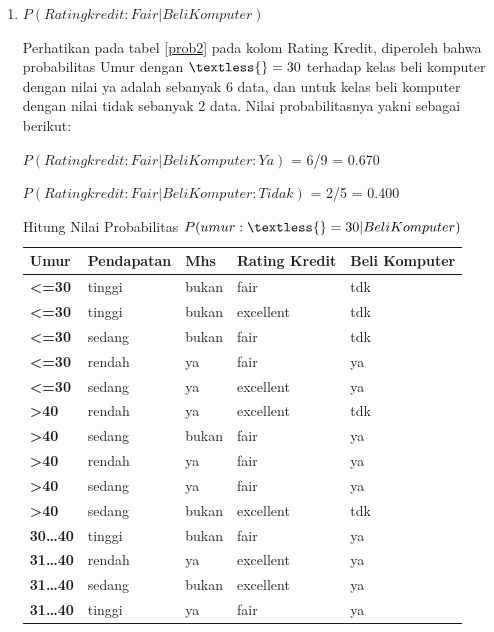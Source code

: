 \begin{enumerate}
\item $P(Ratingkredit:Fair|Beli Komputer)$
\par Perhatikan pada tabel \ref{prob2} pada kolom Rating Kredit, diperoleh bahwa probabilitas Umur dengan $\textless{}=30$ terhadap kelas beli komputer dengan nilai ya adalah sebanyak 6 data, dan untuk kelas beli komputer dengan nilai tidak sebanyak 2 data. Nilai probabilitasnya yakni sebagai berikut:
\par $P(Ratingkredit:Fair|Beli Komputer:Ya)$ = 6/9	=  0.670
\par $P(Ratingkredit:Fair|Beli Komputer:Tidak)$ = 2/5  =  0.400
    \begin{table}[!ht]
    \centering
    \caption{Hitung Nilai Probabilitas $P(umur :\textless{}=30|Beli Komputer)$ }
    \label{prob1}
\begin{tabular}{|l|l|l|l|l|}
\hline
\textbf{Umur}             & Pendapatan & Mhs   & Rating Kredit & Beli Komputer \\ \hline
\textbf{\textless{}=30}   & tinggi     & bukan & fair          & tdk           \\ \hline
\textbf{\textless{}=30}   & tinggi     & bukan & excellent     & tdk           \\ \hline
\textbf{\textless{}=30}   & sedang     & bukan & fair          & tdk           \\ \hline
\textbf{\textless{}=30}   & rendah     & ya    & fair          & ya            \\ \hline
\textbf{\textless{}=30}   & sedang     & ya    & excellent     & ya            \\ \hline
\textbf{\textgreater{}40} & rendah     & ya    & excellent     & tdk           \\ \hline
\textbf{\textgreater{}40} & sedang     & bukan & fair          & ya            \\ \hline
\textbf{\textgreater{}40} & rendah     & ya    & fair          & ya            \\ \hline
\textbf{\textgreater{}40} & sedang     & ya    & fair          & ya            \\ \hline
\textbf{\textgreater{}40} & sedang     & bukan & excellent     & tdk           \\ \hline
\textbf{30…40}            & tinggi     & bukan & fair          & ya            \\ \hline
\textbf{31…40}            & rendah     & ya    & excellent     & ya            \\ \hline
\textbf{31…40}            & sedang     & bukan & excellent     & ya            \\ \hline
\textbf{31…40}            & tinggi     & ya    & fair          & ya            \\ \hline
\end{tabular}
\end{table}




\end{enumerate}
